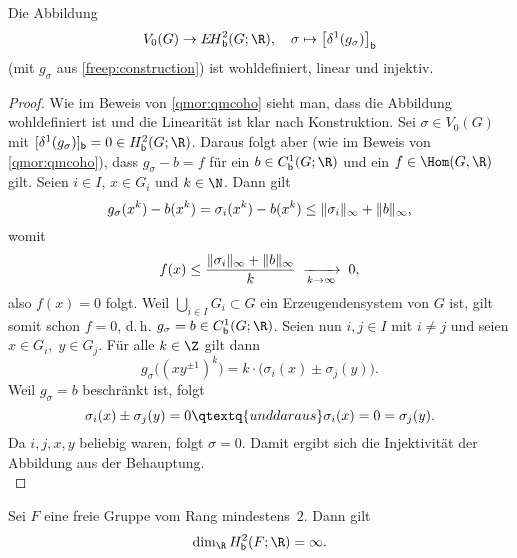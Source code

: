 \begin{thProposition}
    \label{freep:qmtocoho}%
    Die Abbildung
    \[ V_0(G) \to \EHb^2(G;\R), \quad
        \sigma \mapsto \bigl[\delta^1(g_\sigma)\bigr]_\bd
    \]
    (mit $g_\sigma$ aus \cref{freep:construction})
    ist wohldefiniert, linear und injektiv.
\end{thProposition}

\begin{proof}
    Wie im Beweis von \cref{qmor:qmcoho} sieht man, dass die Abbildung
    wohldefiniert ist und die Linearität ist klar nach Konstruktion.
    Sei $\sigma\in V_0(G)$ mit
    $[\delta^1(g_\sigma)]_\bd = 0 \in\Hb^2(G;\R)$. Daraus folgt aber
    (wie im Beweis von \cref{qmor:qmcoho}), dass $g_\sigma - b = f$
    für ein $b\in\Cb^1(G;\R)$ und ein $f\in\Hom(G,\R)$ gilt. Seien
    $i\in I$, $x\in G_i$ und $k\in\N$. Dann gilt
    \[ g_\sigma(x^k) - b(x^k) = \sigma_i(x^k) - b(x^k) 
        \leq \lVert\sigma_i\rVert_\infty + \lVert b\rVert_\infty
    , \]
    womit
    \[ f(x) \leq \frac{\lVert\sigma_i\rVert_\infty + \lVert b\rVert_\infty}{k}
        \;\xrightarrow[k\to\infty]{}\; 0
    , \]
    also $f(x) = 0$ folgt. Weil $\bigcup_{i\in I} G_i \subset G$ ein
    Erzeugendensystem von $G$ ist, gilt somit schon $f=0$, d.\,h.
    $g_\sigma = b \in\Cb^1(G;\R)$. Seien nun $i,j\in I$ mit $i\neq j$ und
    seien $x\in G_i,\; y\in G_j$. Für alle $k\in\Z$ gilt dann
    \[ g_\sigma\bigl( (xy^{\pm1})^k \bigr)
        = k\cdot \bigl( \sigma_i(x) \pm \sigma_j(y) \bigr)
    . \]
    Weil $g_\sigma = b$ beschränkt ist, folgt 
    \[ \sigma_i(x) \pm \sigma_j(y) = 0
        \qtextq{und daraus}
        \sigma_i(x) = 0 = \sigma_j(y)
    . \]
    Da $i,j,x,y$ beliebig waren, folgt $\sigma = 0$. Damit ergibt sich
    die Injektivität der Abbildung aus der Behauptung.
    \\
\end{proof}

\begin{thKorollar}
    \label{freep:cohofreegrp}%
    Sei $F$ eine freie Gruppe vom Rang mindestens~$2$. Dann gilt
    \[ \dim_{\R} \Hb^2(F;\R) = \infty  . \]
\end{thKorollar}

